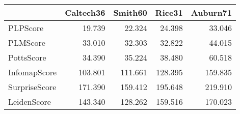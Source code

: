 \begin{tabular}{lrrrr}
\toprule
{} & Caltech36 & Smith60 &  Rice31 & Auburn71 \\
\midrule
PLPScore      &    19.739 &  22.324 &  24.398 &   33.046 \\
PLMScore      &    33.010 &  32.303 &  32.822 &   44.015 \\
PottsScore    &    34.390 &  35.224 &  38.480 &   60.518 \\
InfomapScore  &   103.801 & 111.661 & 128.395 &  159.835 \\
SurpriseScore &   171.390 & 159.412 & 195.648 &  219.910 \\
LeidenScore   &   143.340 & 128.262 & 159.516 &  170.023 \\
\bottomrule
\end{tabular}
